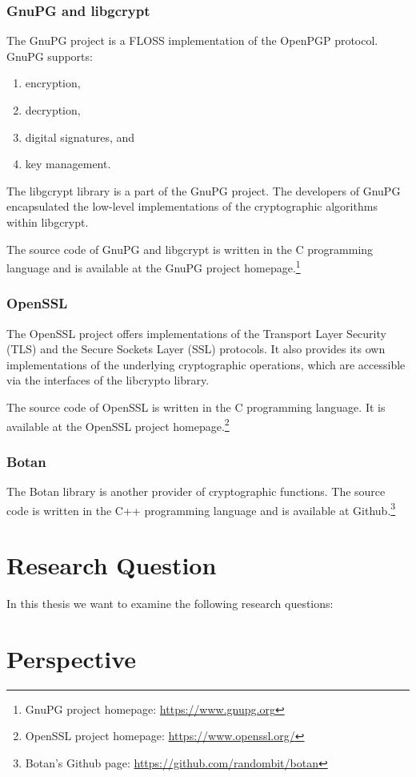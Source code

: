   \subsubsection{GnuPG and libgcrypt}

The GnuPG project is a FLOSS implementation of the OpenPGP protocol.
GnuPG supports:
\begin{enumerate}
\item encryption,
\item decryption,
\item digital signatures, and
\item key management.\cite{gnupg-doc}
\end{enumerate}

The libgcrypt library is a part of the GnuPG project.
The developers of GnuPG encapsulated the low-level implementations of the cryptographic algorithms within libgcrypt.

The source code of GnuPG and libgcrypt is written in the C programming language and is available at the GnuPG project homepage.\footnote{GnuPG project homepage: \url{https://www.gnupg.org}}

  \subsubsection{OpenSSL}

The OpenSSL project offers implementations of the Transport Layer Security (TLS) and the Secure Sockets Layer (SSL) protocols.
It also provides its own implementations of the underlying cryptographic operations, which are accessible via the interfaces of the libcrypto library.

The source code of OpenSSL is written in the C programming language.
It is available at the OpenSSL project homepage.\footnote{OpenSSL project homepage: \url{https://www.openssl.org/}}

  \subsubsection{Botan}

The Botan library is another provider of cryptographic functions.
The source code is written in the C++ programming language and is available at Github.\footnote{Botan's Github page: \url{https://github.com/randombit/botan}}

\section{Research Question}
\label{researchq}

In this thesis we want to examine the following research questions:


\section{Perspective}


